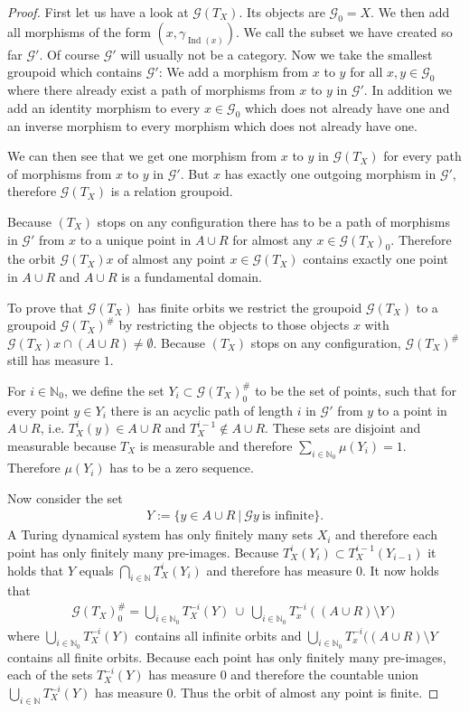 \documentclass[12pt,a4paper]{scrartcl}
\theoremstyle{plain}
\theoremstyle{definition}
\numberwithin{equation}{section}
\newcommand{\N}{\mathbb{N}} %
\newcommand{\2}{\mathbb{Z} / 2 \mathbb{Z}}
\newcommand{\G}{\mathcal{G}}
\newcommand{\1}{\bar{1}}
\newcommand{\0}{\bar{0}}
\newcommand{\Ind}{\operatorname{Ind}}
\begin{document}
\begin{proof}
	First let us have a look at $\G (T_X)$. Its objects are $\G_0 = X$. We then add all morphisms of the form $(x, \gamma_{\Ind(x)})$. We call the subset we have created so far $\G'$. Of course $\G'$ will usually not be a category. Now we take the smallest groupoid which contains $\G'$: We add a morphism from $x$ to $y$ for all $x, y \in \G_0$ where there already exist a path of morphisms from $x$ to $y$ in $\G'$. In addition we add an identity morphism to every $ x\in \G_0$ which does not already have one and an inverse morphism to every morphism which does not already have one. 
	
	We can then see that we get one morphism from $x$ to $y$ in $\G (T_X)$ for every path of morphisms from $x$ to $y$ in $\G'$. But $x$ has exactly one outgoing morphism in $\G'$, therefore $\G (T_X)$ is a relation groupoid.

	Because $(T_X)$ stops on any configuration there has to be a path of morphisms in $\G'$ from $x$ to a unique point in $A \cup R$ for almost any $x \in \G (T_X)_0$. Therefore the orbit $\G (T_X)x$ of almost any point $x \in \G (T_X)$ contains exactly one point in $A \cup R$ and $A \cup R$ is a fundamental domain.
	
	To prove that $\G (T_X)$ has finite orbits we restrict the groupoid $\G (T_X)$ to a groupoid $\G (T_X)^\#$ by restricting the objects to those objects $x$ with $\G (T_X)x \cap (A \cup R) \neq \emptyset$. Because $(T_X)$ stops on any configuration, $\G (T_X)^\#$ still has measure $1$.
	
	For $i \in \N_0$, we define the set $Y_i \subset \G (T_X)_0^\#$ to be the set of points, such that for every point $y \in Y_i$ there is an acyclic path of length $i$ in $\G'$ from $y$ to a point in $A \cup R$, i.e. $T_X^i(y) \in A \cup R$ and $T_X^{i-1} \notin A \cup R$. These sets are disjoint and measurable because $T_X$ is measurable and therefore $\sum_{i \in \N_0} \mu(Y_i) = 1$. Therefore $\mu(Y_i)$ has to be a zero sequence.
	
	Now consider the set 
	\begin{align*}
		Y := \{y \in A \cup R ~|~ \G y ~ \text{is infinite}\}. 
	\end{align*}
	A Turing dynamical system has only finitely many sets $X_i$ and therefore each point has only finitely many pre-images. Because $T_X^i(Y_i) \subset T_X^{i-1}(Y_{i-1})$ it holds that $Y$ equals $\bigcap_{i \in \N} T_X^i(Y_i)$ and therefore has measure $0$. It now holds that 
	\begin{align*}
		\G (T_X)_0^\# =\bigcup_{i \in \N_0 }T_X^{-i}(Y) ~\cup~ \bigcup_{i \in \N_0 }T_x^{-i}((A\cup R) \setminus Y)
	\end{align*}
	where $\bigcup_{i \in \N_0 }T_X^{-i}(Y)$ contains all infinite orbits and $\bigcup_{i \in \N_0 }T_x^{-i}((A\cup R) \setminus Y$ contains all finite orbits. Because each point has only finitely many pre-images, each of the sets $T_X^{-i}(Y)$ has measure $0$ and therefore the countable union $\bigcup_{i \in \N }T_X^{-i}(Y)$ has measure $0$. Thus the orbit of almost any point is finite. 
\end{proof} 
\end{document}
